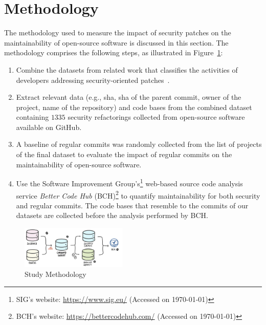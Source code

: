 \documentclass[sigconf,review]{acmart}
\begin{document}
\section{Methodology}\label{sec:methodology}
%
The methodology used to measure the impact of security patches on the
maintainability of open-source software is discussed in this section.
The methodology comprises the following steps, as illustrated in
Figure~\ref{fig:met}:
%
\begin{enumerate}
	\item Combine the datasets from related work that classifies
the activities of developers addressing security-oriented patches~\cite{Reis:2017:IJSSE, 10.1109/MSR.2019.00064}.
%
	\item
	Extract relevant data (e.g., sha, sha of the parent commit, owner of the project, name of 
	the repository) and code bases from the combined dataset containing $1335$ security
	refactorings collected from open-source software available on
	GitHub.
%
	\item A baseline of regular commits was randomly collected from the list of
	projects of the final dataset to evaluate the impact of regular commits on the
	maintainability of open-source software.
%
  \item Use the Software Improvement Group's\footnote{SIG's website: \url{https://www.sig.eu/} 
  (Accessed on \today{})} web-based source code analysis
  service \emph{Better Code Hub} (BCH)\footnote{BCH's website:
  \url{https://bettercodehub.com/} (Accessed on \today{})} to quantify maintainability
  for both security and regular commits. The code bases that resemble to the commits
  of our datasets are collected before the analysis performed by BCH.
\end{enumerate}
%
\begin{figure}[h]
 	\centering 	\includegraphics[width=0.45\textwidth]{figures/methodology.pdf}
 	\caption{Study Methodology}
	\label{fig:met}
\end{figure}
%
\end{document}
